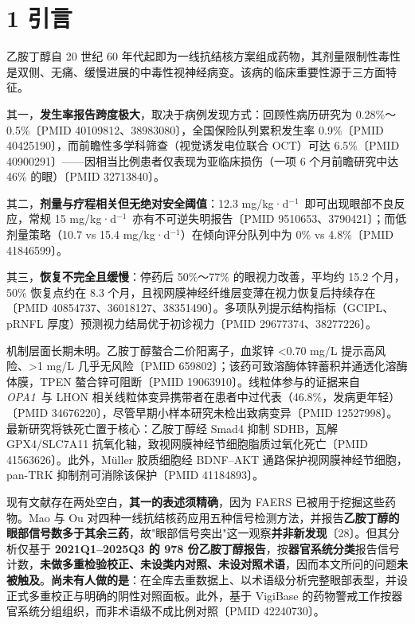 \documentclass[UTF8,fontset=windows,11pt]{ctexart}
\begin{document}
\section{1 引言}

乙胺丁醇自 20 世纪 60 年代起即为一线抗结核方案组成药物，其剂量限制性毒性是双侧、无痛、缓慢进展的中毒性视神经病变。该病的临床重要性源于三方面特征。

其一，\textbf{发生率报告跨度极大}，取决于病例发现方式：回顾性病历研究为 0.28\%～0.5\%〔PMID 40109812、38983080〕，全国保险队列累积发生率 0.9\%〔PMID 40425190〕，而前瞻性多学科筛查（视觉诱发电位联合 OCT）可达 6.5\%〔PMID 40900291〕——因相当比例患者仅表现为亚临床损伤（一项 6 个月前瞻研究中达 46\% 的眼）〔PMID 32713840〕。

其二，\textbf{剂量与疗程相关但无绝对安全阈值}：12.3 mg/kg·d$^{-1}$\ 即可出现眼部不良反应，常规 15 mg/kg·d$^{-1}$\ 亦有不可逆失明报告〔PMID 9510653、3790421〕；而低剂量策略（10.7 vs 15.4 mg/kg·d$^{-1}$）在倾向评分队列中为 0\% vs 4.8\%〔PMID 41846599〕。

其三，\textbf{恢复不完全且缓慢}：停药后 50\%～77\% 的眼视力改善，平均约 15.2 个月，50\% 恢复点约在 8.3 个月，且视网膜神经纤维层变薄在视力恢复后持续存在〔PMID 40854737、36018127、38351490〕。多项队列提示结构指标（GCIPL、pRNFL 厚度）预测视力结局优于初诊视力〔PMID 29677374、38277226〕。

机制层面长期未明。乙胺丁醇螯合二价阳离子，血浆锌 <0.70 mg/L 提示高风险、>1 mg/L 几乎无风险〔PMID 659802〕；该药可致溶酶体锌蓄积并通透化溶酶体膜，TPEN 螯合锌可阻断〔PMID 19063910〕。线粒体参与的证据来自 \textit{OPA1}\ 与 LHON 相关线粒体变异携带者在患者中过代表（46.8\%，发病更年轻）〔PMID 34676220〕，尽管早期小样本研究未检出致病变异〔PMID 12527998〕。最新研究将铁死亡置于核心：乙胺丁醇经 Smad4 抑制 SDHB，瓦解 GPX4/SLC7A11 抗氧化轴，致视网膜神经节细胞脂质过氧化死亡〔PMID 41563626〕。此外，Müller 胶质细胞经 BDNF–AKT 通路保护视网膜神经节细胞，pan-TRK 抑制剂可消除该保护〔PMID 41184893〕。

现有文献存在两处空白，\textbf{其一的表述须精确}，因为 FAERS 已被用于挖掘这些药物。Mao 与 Ou 对四种一线抗结核药应用五种信号检测方法，并报告\textbf{乙胺丁醇的眼部信号数多于其余三药}，故"眼部信号突出"这一观察\textbf{并非新发现}〔28〕。但其分析仅基于 \textbf{2021Q1–2025Q3 的 978 份乙胺丁醇报告}，按\textbf{器官系统分类}报告信号计数，\textbf{未做多重检验校正、未设类内对照、未设对照术语}，因而本文所问的问题\textbf{未被触及}。\textbf{尚未有人做的是}：在全库去重数据上、以术语级分析完整眼部表型，并设正式多重校正与明确的阴性对照面板。此外，基于 VigiBase 的药物警戒工作按器官系统分组组织，而非术语级不成比例对照〔PMID 42240730〕。
\end{document}
